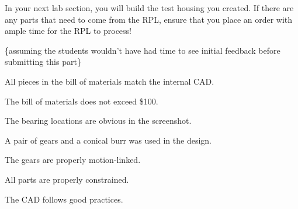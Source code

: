 \documentclass[11pt,letterpaper]{article}
\begin{document}
In your next lab section, you will build the test housing you created. If there are any parts that need to come from the RPL, ensure that you place an order with ample time for the RPL to process!

\newpage

\{assuming the students wouldn't have had time to see initial feedback before submitting this part\}

\begin{Checklist}
  \item All pieces in the bill of materials match the internal CAD.
  \item The bill of materials does not exceed \$100.
  \item The bearing locations are obvious in the screenshot.
  \item A pair of gears and a conical burr was used in the design.
  \item The gears are properly motion-linked.
  \item All parts are properly constrained.
  \item The CAD follows good practices.
\end{Checklist}
\end{document}
